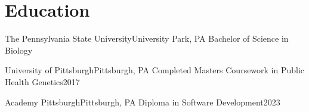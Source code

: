 
\section{Education}
\resumeSubHeadingListStart
  \resumeSubheading
    {The Pennsylvania State University}{University Park, PA}
    {Bachelor of Science in Biology}{}

  \resumeSubheading
    {University of Pittsburgh}{Pittsburgh, PA}
    {Completed Masters Coursework in Public Health Genetics}{2017}

  \resumeSubheading
    {Academy Pittsburgh}{Pittsburgh, PA}
    {Diploma in Software Development}{2023}
\resumeSubHeadingListEnd
